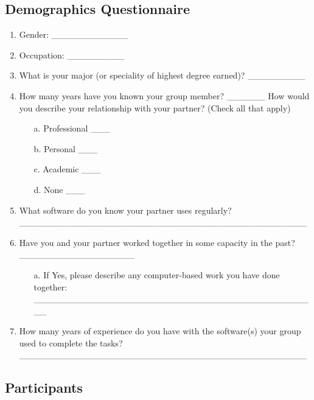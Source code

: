 \subsection{Demographics Questionnaire}
\label{app-peer-survey}

\begin{enumerate}
    \item Gender: \_\_\_\_\_\_\_\_\_\_\_\_
    \item Occupation: \_\_\_\_\_\_\_\_\_
    \item What is your major (or speciality of highest degree earned)? \_\_\_\_\_\_\_\_\_
    \item How many years have you known your group member? \_\_\_\_\_\_
    How would you describe your relationship with your partner? (Check all that apply)
    \begin{itemize}
        \item[a.] Professional \_\_\_
        \item[b.] Personal \_\_\_
        \item[c.] Academic \_\_\_
        \item[d.] None \_\_\_
    \end{itemize}
    \item What software do you know your partner uses regularly? \\ \_\_\_\_\_\_\_\_\_\_\_\_\_\_\_\_\_\_\_\_\_\_\_\_\_\_\_\_\_\_\_\_\_\_\_\_\_\_\_\_\_\_\_\_\_
    \item Have you and your partner worked together in some capacity in the past? \_\_\_\_\_\_\_\_\_\_\_\_\_\_\_\_\_\_
    \begin{itemize}
        \item[a.] If Yes, please describe any computer-based work you have done together: \\
        \_\_\_\_\_\_\_\_\_\_\_\_\_\_\_\_\_\_\_\_\_\_\_\_\_\_\_\_\_\_\_\_\_\_\_\_\_\_\_\_\_\_\_\_\_
    \end{itemize}
    \item How many years of experience do you have with the software(s) your group used to complete the tasks? \_\_\_\_\_\_\_\_\_\_\_\_\_\_\_\_\_\_\_\_\_\_\_\_\_\_\_\_\_\_\_\_\_\_\_\_\_\_\_\_\_\_\_\_\_
\end{enumerate}

\subsection{Participants}
\label{app-peer-participants}

